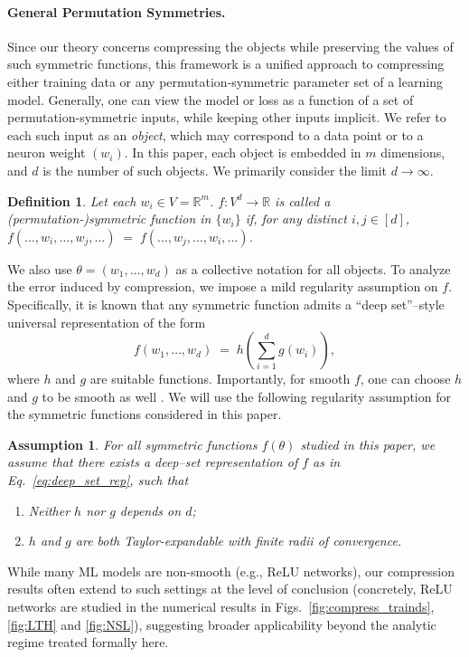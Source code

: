 \documentclass{article}
\theoremstyle{plain}
\newtheorem{definition}{Definition}
\newtheorem{assumption}{Assumption}
\def\REV#1{{\color[HTML]{000000}#1}}
\begin{document}
\vspace{-2mm}
\paragraph{General Permutation Symmetries.} Since our theory concerns compressing the objects while preserving the values of such symmetric functions, this framework is a unified approach to compressing either training data or any permutation-symmetric parameter set of a learning model. Generally, one can view the model or loss as a function of a set of permutation-symmetric inputs, while keeping other inputs implicit. We refer to each such input as an \emph{object}, which may correspond to a data point or to a neuron weight $(w_i)$. In this paper, each object is embedded in $m$ dimensions, and $d$ is the number of such objects. We primarily consider the limit $d \to \infty$. 

\begin{definition}
    Let each $w_i \in V = \mathbb{R}^m$. $f: V^d \to \mathbb{R}$ is called a (permutation-)symmetric function in $\{w_i\}$ if, for any distinct $i,j \in [d]$, $f(\dots, w_i, \dots, w_j, \dots) \;=\; f(\dots, w_j, \dots, w_i, \dots)$.
\end{definition}

We also use $\theta = (w_1, \dots, w_d)$ as a collective notation for all objects. %
To analyze the error induced by compression, we impose a mild regularity assumption on $f$. Specifically, it is known that any symmetric function admits a ``deep set''--style universal representation \citep{zaheer2018deepsets} of the form
\begin{equation}    \label{eq:deep_set_rep}
    f(w_1, \dots, w_d) \;=\; h \left( \sum_{i=1}^d g(w_i) \right),
\end{equation}
where \REV{$h$} and $g$ are suitable functions. Importantly, for smooth $f$, one can choose $h$ and $g$ to be smooth as well \citep{tabaghi2023universalrep}. We will use the following regularity assumption for the symmetric functions considered in this paper.
\begin{assumption}\label{assump:analytic_deepsets}
    For all symmetric functions $f(\theta)$ studied in this paper, we assume that there exists a deep--set representation of $f$ as in Eq.~\eqref{eq:deep_set_rep}, such that
    \begin{enumerate}
        \item Neither $h$ nor $g$ depends on $d$;
        \item $h$ and $g$ are both Taylor-expandable with finite radii of convergence. 
    \end{enumerate}
\end{assumption}
While many ML models are non-smooth (e.g., ReLU networks), our compression results often extend to such settings at the level of conclusion (concretely, ReLU networks are studied in the numerical results in Figs.~\ref{fig:compress_trainds}, \ref{fig:LTH} and \ref{fig:NSL}), suggesting broader applicability beyond the analytic regime treated formally here.
\end{document}
